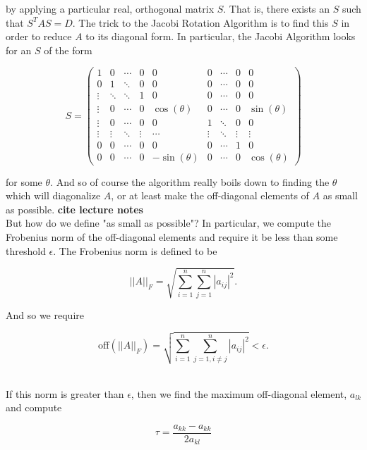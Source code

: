 \documentclass[12pt]{article}
\numberwithin{equation}{section}
\begin{document}
by applying a particular real, orthogonal matrix $S$.  That is, there exists an $S$ such that $S^{T}AS=D$.  The trick to the Jacobi Rotation Algorithm is to find this $S$ in order to reduce $A$ to its diagonal form.  In particular, the Jacobi Algorithm looks for an $S$ of the form

$$S = \left(\begin{array}{ccccccccc}
1 & 0 & \cdots & 0 & 0 & 0 & \cdots & 0 & 0 \\
0 & 1 & \ddots & 0 & 0 & 0 & \cdots & 0 & 0 \\
\vdots & \ddots & \ddots & 1 & 0 & 0 & \cdots & 0 & 0 \\
\vdots & 0 & \cdots & 0 & \cos(\theta) & 0 & \cdots & 0 & \sin(\theta) \\
\vdots & 0 & \cdots & 0 & 0 & 1 & \ddots & 0 & 0 \\
\vdots & \vdots & \ddots & \vdots & \cdots & \vdots & \ddots & \vdots & \vdots \\
0 & 0 & \cdots & 0 & 0 & 0 & \cdots & 1 & 0 \\
0 & 0 & \cdots & 0 & -\sin(\theta) & 0 & \cdots & 0 & \cos(\theta) 
\end{array}\right)$$

for some $\theta$.  And so of course the algorithm really boils down to finding the $\theta$ which will diagonalize $A$, or at least make the off-diagonal elements of $A$ as small as possible. \textbf{cite lecture notes}  
\\\indent But how do we define "as small as possible"?  In particular, we compute the Frobenius norm of the off-diagonal elements and require it be less than some threshold $\epsilon$.  The Frobenius norm is defined to be 

\begin{equation}
\label{eq:frob}
||A||_{F} = \sqrt{\sum_{i=1}^{n}\sum_{j=1}^{n}|a_{ij}|^{2}}.
\end{equation}

\noindent And so we require

\begin{equation}
\text{off}(||A||_{F}) = \sqrt{\sum_{i=1}^{n}\sum_{j=1,i\neq j}^{n}|a_{ij}|^{2}}<\epsilon.
\end{equation}

\\\indent If this norm is greater than $\epsilon$, then we find the maximum off-diagonal element, $a_{lk}$ and compute

$$\tau=\frac{a_{kk}-a_{kk}}{2a_{kl}}$$
\end{document}
